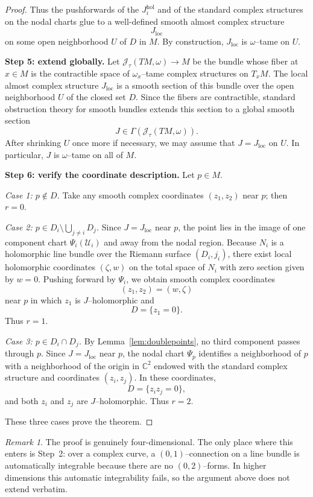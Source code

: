\documentclass[11pt]{article}
\theoremstyle{remark}
\newtheorem{remark}[theorem]{Remark}
\newcommand{\CC}{\mathbb{C}}
\begin{document}
\begin{proof}
Thus the pushforwards of the $J_i^{\mathrm{hol}}$ and of the standard complex structures
on the nodal charts glue to a well-defined smooth almost complex structure
\[
J_{\mathrm{loc}}
\]
on some open neighborhood $U$ of $D$ in $M$.
By construction, $J_{\mathrm{loc}}$ is $\omega$--tame on $U$.

\medskip
\noindent\textbf{Step 5: extend globally.}
Let $\mathcal J_\tau(TM,\omega)\to M$ be the bundle whose fiber at $x\in M$
is the contractible space of $\omega_x$--tame complex structures on $T_xM$.
The local almost complex structure $J_{\mathrm{loc}}$ is a smooth section of this
bundle over the open neighborhood $U$ of the closed set $D$.
Since the fibers are contractible, standard obstruction theory for smooth bundles
extends this section to a global smooth section
\[
J\in \Gamma(\mathcal J_\tau(TM,\omega)).
\]
After shrinking $U$ once more if necessary, we may assume that $J=J_{\mathrm{loc}}$
on $U$.
In particular, $J$ is $\omega$--tame on all of $M$.

\medskip
\noindent\textbf{Step 6: verify the coordinate description.}
Let $p\in M$.

\smallskip
\emph{Case 1: $p\notin D$.}
Take any smooth complex coordinates $(z_1,z_2)$ near $p$; then $r=0$.

\smallskip
\emph{Case 2: $p\in D_i\setminus \bigcup_{j\neq i}D_j$.}
Since $J=J_{\mathrm{loc}}$ near $p$, the point lies in the image of one component
chart $\Psi_i(\mathcal U_i)$ and away from the nodal region.
Because $N_i$ is a holomorphic line bundle over the Riemann surface $(D_i,j_i)$,
there exist local holomorphic coordinates $(\zeta,w)$ on the total space of $N_i$
with zero section given by $w=0$.
Pushing forward by $\Psi_i$, we obtain smooth complex coordinates
\[
(z_1,z_2)=(w,\zeta)
\]
near $p$ in which $z_1$ is $J$--holomorphic and
\[
D=\{z_1=0\}.
\]
Thus $r=1$.

\smallskip
\emph{Case 3: $p\in D_i\cap D_j$.}
By Lemma~\ref{lem:doublepoints}, no third component passes through $p$.
Since $J=J_{\mathrm{loc}}$ near $p$, the nodal chart $\Psi_p$ identifies a
neighborhood of $p$ with a neighborhood of the origin in $\CC^2$ endowed with
the standard complex structure and coordinates $(z_i,z_j)$.
In these coordinates,
\[
D=\{z_i z_j=0\},
\]
and both $z_i$ and $z_j$ are $J$--holomorphic.
Thus $r=2$.

\smallskip
These three cases prove the theorem.
\end{proof}

\begin{remark}
The proof is genuinely four-dimensional.
The only place where this enters is Step~2:
over a complex curve, a $(0,1)$--connection on a line bundle is automatically
integrable because there are no $(0,2)$--forms.
In higher dimensions this automatic integrability fails, so the argument above does
not extend verbatim.
\end{remark}
\end{document}
